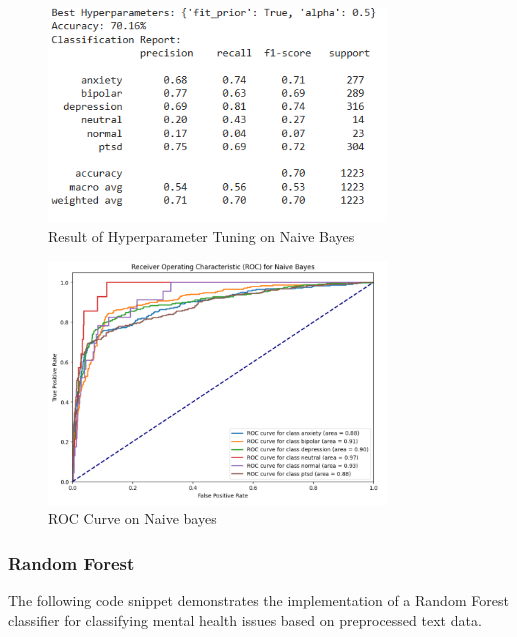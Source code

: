 \begin{figure}[h!]  
    \centering
    \includegraphics[width=0.8\textwidth]{Images/Output HPT NB.png}  
    \caption{Result of Hyperparameter Tuning on Naive Bayes}
    \label{HPT NB}  %
\end{figure}

\begin{figure}[h!]  
    \centering
    \includegraphics[width=0.8\textwidth]{Images/ROC NB.png}  
    \caption{ROC Curve on Naive bayes}
    \label{ROC NB}  %
\end{figure}


\subsubsection{Random Forest}
\noindent
The following code snippet demonstrates the implementation of a Random Forest classifier for classifying mental health issues based on preprocessed text data.

